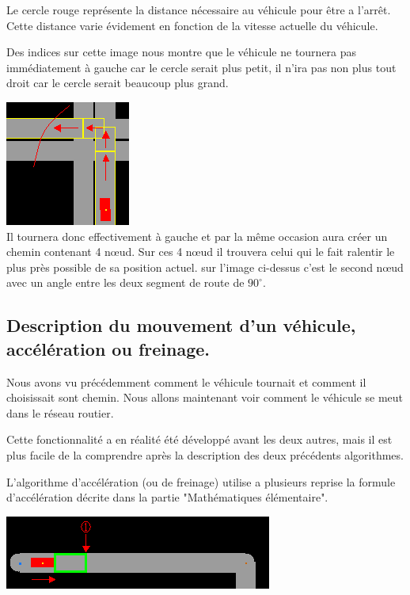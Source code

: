 \documentclass[a4paper,11pt]{article}
\newcommand{\orto}{^{\circ}}
\begin{document}
Le cercle rouge représente la distance nécessaire au véhicule pour être a l'arrêt. Cette distance varie évidement en fonction de la vitesse actuelle du véhicule.

Des indices sur cette image nous montre que le véhicule ne tournera pas immédiatement à gauche car le cercle serait plus petit, il n'ira pas non plus tout droit car le cercle serait beaucoup plus grand.

\vspace{0.25cm}
\includegraphics[scale=0.8]{imgAlgo/path.png}\\

Il tournera donc effectivement à gauche et par la même occasion aura créer un chemin contenant 4 n\oe{}ud. Sur ces 4 n\oe{}ud il trouvera celui qui le fait ralentir le plus près possible de sa position actuel. sur l'image ci-dessus c'est le second n\oe{}ud avec un angle entre les deux segment de route de $90\orto$.

\subsection{Description du mouvement d'un véhicule, accélération ou freinage.}

Nous avons vu précédemment comment le véhicule tournait et comment il choisissait sont chemin. Nous allons maintenant voir comment le véhicule se meut dans le réseau routier.

Cette fonctionnalité a en réalité été développé avant les deux autres, mais il est plus facile de la comprendre après la description des deux précédents algorithmes.

L'algorithme d'accélération (ou de freinage) utilise a plusieurs reprise la formule d'accélération décrite dans la partie "Mathématiques élémentaire".

\vspace{0.25cm}
\includegraphics[scale=0.65]{imgAlgo/dist0km1.png}\\
\end{document}

